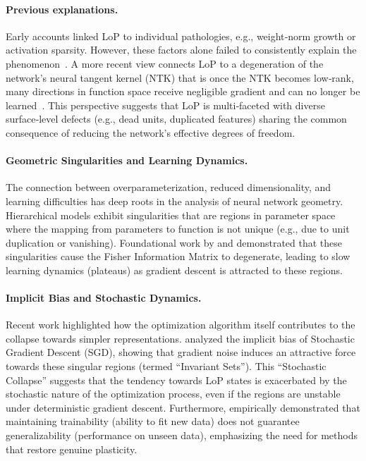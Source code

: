 \documentclass{article}
\numberwithin{figure}{section}
\begin{document}
\vspace{-7pt}
\paragraph{Previous explanations.}  
Early accounts linked LoP to individual pathologies, e.g., weight‑norm growth or activation sparsity. However, these factors alone failed to consistently explain the phenomenon~\citep{lyle2022understanding}.  A more recent view connects LoP to a degeneration of the network’s {neural tangent kernel} (NTK) that is once the NTK becomes low‑rank, many directions in function space receive negligible gradient and can no longer be learned~\citep{lyle2023understanding}.  This perspective suggests that LoP is multi‑faceted with diverse surface‑level defects (e.g., dead units, duplicated features) sharing the common consequence of reducing the network’s effective degrees of freedom.

\vspace{-7pt}
\paragraph{Geometric Singularities and Learning Dynamics.}
The connection between overparameterization, reduced dimensionality, and learning difficulties has deep roots in the analysis of neural network geometry. Hierarchical models exhibit {singularities} that are regions in parameter space where the mapping from parameters to function is not unique (e.g., due to unit duplication or vanishing). Foundational work by \citet{fukumizu2000local} and \citet{amari2006singularities} demonstrated that these singularities cause the Fisher Information Matrix to degenerate, leading to slow learning dynamics (plateaus) as gradient descent is attracted to these regions.

\vspace{-7pt}
\paragraph{Implicit Bias and Stochastic Dynamics.}
Recent work highlighted how the optimization algorithm itself contributes to the collapse towards simpler representations. \citet{chen2023stochastic} analyzed the implicit bias of Stochastic Gradient Descent (SGD), showing that gradient noise induces an attractive force towards these singular regions (termed ``Invariant Sets''). This ``Stochastic Collapse'' suggests that the tendency towards LoP states is exacerbated by the stochastic nature of the optimization process, even if the regions are unstable under deterministic gradient descent. Furthermore, \citet{wang2024comprehensive} empirically demonstrated that maintaining {trainability} (ability to fit new data) does not guarantee {generalizability} (performance on unseen data), emphasizing the need for methods that restore genuine plasticity.
\end{document}
